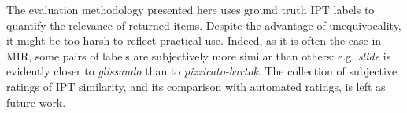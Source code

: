 \documentclass{article}
\makeatletter
\newcommand*{\eg}{e.g.\@\xspace}
\makeatother
\begin{document}
The evaluation methodology presented here uses ground truth IPT labels to quantify the relevance of returned items.
Despite the advantage of unequivocality, it might be too harsh to reflect practical use.
Indeed, as it is often the case in MIR, some pairs of labels are subjectively more similar than others: \eg{} \emph{slide} is evidently closer to \emph{glissando} than to \emph{pizzicato-bartok}.
The collection of subjective ratings of IPT similarity, and its comparison with automated ratings, is left as future work.








\end{document}
